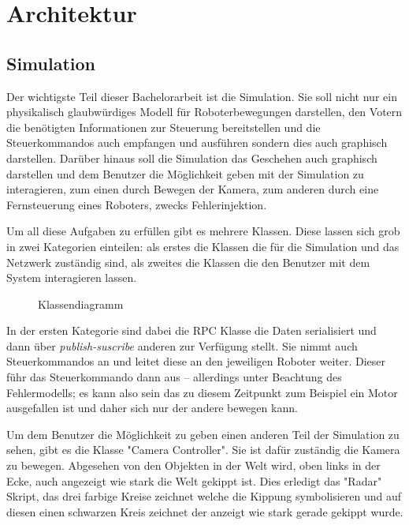 \clearpage
\section{Architektur}

\subsection{Simulation}
Der wichtigste Teil dieser Bachelorarbeit ist die Simulation. Sie soll nicht nur ein physikalisch glaubw{\"{u}}rdiges Modell
f{\"{u}}r Roboterbewegungen darstellen, den Votern die ben{\"{o}}tigten Informationen zur Steuerung bereitstellen und die
Steuerkommandos auch empfangen und ausf{\"{u}}hren sondern dies auch graphisch darstellen. Dar{\"{u}}ber hinaus soll die
Simulation das Geschehen auch graphisch darstellen und dem Benutzer die M{\"{o}}glichkeit geben mit der Simulation zu
interagieren, zum einen durch Bewegen der Kamera, zum anderen durch eine Fernsteuerung eines Roboters, zwecks Fehlerinjektion.

Um all diese Aufgaben zu erf{\"{u}}llen gibt es mehrere Klassen. Diese lassen sich grob in zwei Kategorien einteilen: als
erstes die Klassen die f{\"{u}}r die Simulation und das Netzwerk zust{\"{a}}ndig sind, als zweites die Klassen die den Benutzer
mit dem System interagieren lassen.
\begin{figure}
	\centering
	\caption{Klassendiagramm}
	\label{fig:arch}
\end{figure}

In der ersten Kategorie sind dabei die RPC Klasse die Daten serialisiert und dann {\"{u}}ber \textit{publish-suscribe} anderen
zur Verf{\"{u}}gung stellt. Sie nimmt auch Steuerkommandos an und leitet diese an den jeweiligen Roboter weiter. Dieser f{\"{u}}hr
das Steuerkommando dann aus -- allerdings unter Beachtung des Fehlermodells; es kann also sein das zu diesem Zeitpunkt zum
Beispiel ein Motor ausgefallen ist und daher sich nur der andere bewegen kann.

Um dem Benutzer die M{\"{o}}glichkeit zu geben einen anderen Teil der Simulation zu sehen, gibt es die Klasse "Camera Controller".
Sie ist daf{\"{u}}r zust{\"{a}}ndig die Kamera zu bewegen. Abgesehen von den Objekten in der Welt wird, oben links in der Ecke,
auch angezeigt wie stark die Welt gekippt ist. Dies erledigt das "Radar" Skript, das drei farbige Kreise zeichnet welche die
Kippung symbolisieren und auf diesen einen schwarzen Kreis zeichnet der anzeigt wie stark gerade gekippt wurde.

